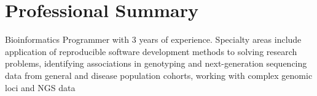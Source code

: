 \documentclass{article}
\begin{document}


\section*{Professional Summary} \vspace{-1em} \hrulefill \vspace{.5em}

\noindent Bioinformatics Programmer with 3 years of experience. Specialty areas include application of reproducible
software development methods to solving research problems, identifying associations in genotyping and next-generation 
sequencing data from general and disease population cohorts, working with complex genomic loci and NGS data

\end{document}
